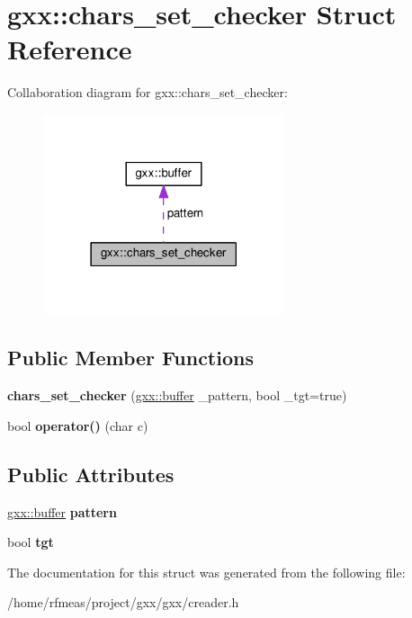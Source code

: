 \hypertarget{structgxx_1_1chars__set__checker}{}\section{gxx\+:\+:chars\+\_\+set\+\_\+checker Struct Reference}
\label{structgxx_1_1chars__set__checker}


Collaboration diagram for gxx\+:\+:chars\+\_\+set\+\_\+checker\+:\nopagebreak
\begin{figure}[H]
\begin{center}
\leavevmode
\includegraphics[width=201pt]{structgxx_1_1chars__set__checker__coll__graph}
\end{center}
\end{figure}
\subsection*{Public Member Functions}
\begin{DoxyCompactItemize}
\item 
{\bfseries chars\+\_\+set\+\_\+checker} (\hyperlink{classgxx_1_1buffer}{gxx\+::buffer} \+\_\+pattern, bool \+\_\+tgt=true)\hypertarget{structgxx_1_1chars__set__checker_aa1417ce025b8d17d48fd28fac2fb6f64}{}\label{structgxx_1_1chars__set__checker_aa1417ce025b8d17d48fd28fac2fb6f64}

\item 
bool {\bfseries operator()} (char c)\hypertarget{structgxx_1_1chars__set__checker_a5947c8b51919817e40adf25f93623923}{}\label{structgxx_1_1chars__set__checker_a5947c8b51919817e40adf25f93623923}

\end{DoxyCompactItemize}
\subsection*{Public Attributes}
\begin{DoxyCompactItemize}
\item 
\hyperlink{classgxx_1_1buffer}{gxx\+::buffer} {\bfseries pattern}\hypertarget{structgxx_1_1chars__set__checker_af000461ade68f18a441258d4c08713cb}{}\label{structgxx_1_1chars__set__checker_af000461ade68f18a441258d4c08713cb}

\item 
bool {\bfseries tgt}\hypertarget{structgxx_1_1chars__set__checker_a475f177962094025b8c58022d2635382}{}\label{structgxx_1_1chars__set__checker_a475f177962094025b8c58022d2635382}

\end{DoxyCompactItemize}


The documentation for this struct was generated from the following file\+:\begin{DoxyCompactItemize}
\item 
/home/rfmeas/project/gxx/gxx/creader.\+h\end{DoxyCompactItemize}
